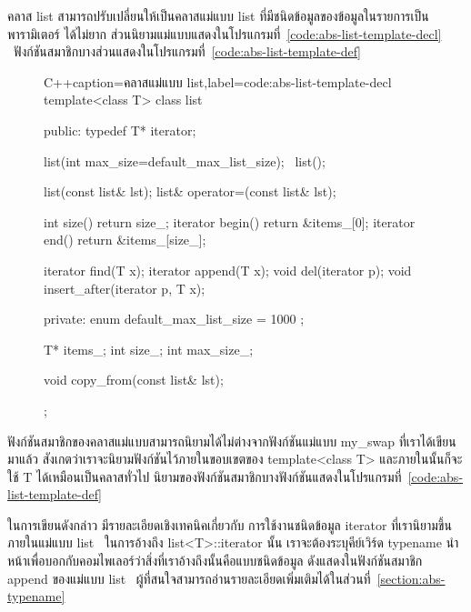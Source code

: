 ค{\wbr}ลา{\wbr}ส {\ct list} สามารถ{\wbr}ปรับ{\wbr}เปลี่ยน{\wbr}ให้{\wbr}เป็น{\wbr}ค{\wbr}ลา{\wbr}ส{\wbr}แม่แบบ {\ct list}
ที่{\wbr}มี{\wbr}ชนิด{\wbr}ข้อมูล{\wbr}ของ{\wbr}ข้อมูล{\wbr}ใน{\wbr}รายการ{\wbr}เป็น{\wbr}พารามิเตอร์ ได้{\wbr}ไม่{\wbr}ยาก{\wbr}
ส่วน{\wbr}นิยาม{\wbr}แม่แบบ{\wbr}แสดง{\wbr}ใน{\wbr}โปรแกรม{\wbr}ที่~\ref{code:abs-list-template-decl}
\ ฟังก์ชัน{\wbr}สมาชิก{\wbr}บาง{\wbr}ส่วน{\wbr}แสดง{\wbr}ใน{\wbr}โปรแกรม{\wbr}ที่~\ref{code:abs-list-template-def}

\begin{figure}
\latintext
\begin{codelist}{C++}{caption={\thaitext ค{\wbr}ลา{\wbr}ส{\wbr}แม่แบบ {\ct list}\latintext},label=code:abs-list-template-decl}
template<class T>
class list {
public:
  typedef T* iterator;

  list(int max_size=default_max_list_size);
  ~list();

  list(const list& lst);
  list& operator=(const list& lst);

  int size() { return size_; }
  iterator begin() { return &items_[0]; }
  iterator end() { return &items_[size_]; }

  iterator find(T x);
  iterator append(T x);
  void del(iterator p);
  void insert_after(iterator p, T x);

private:
  enum { default_max_list_size = 1000 };

  T* items_;
  int size_;
  int max_size_;

  void copy_from(const list& lst);
};
\end{codelist}
\thaitext
\end{figure}

ฟังก์ชัน{\wbr}สมาชิก{\wbr}ของ{\wbr}ค{\wbr}ลา{\wbr}ส{\wbr}แม่แบบ{\wbr}สามารถ{\wbr}นิยาม{\wbr}ได้{\wbr}ไม่{\wbr}ต่าง{\wbr}จาก{\wbr}ฟังก์ชัน{\wbr}แม่แบบ {\ct my\_swap}
ที่{\wbr}เรา{\wbr}ได้{\wbr}เขียน{\wbr}มา{\wbr}แล้ว สังเกต{\wbr}ว่า{\wbr}เรา{\wbr}จะ{\wbr}นิยาม{\wbr}ฟังก์ชัน{\wbr}ไว้{\wbr}ภายใน{\wbr}ขอบเขต{\wbr}ของ {\ct
  template<class T>} และ{\wbr}ภายใน{\wbr}นั้น{\wbr}ก็{\wbr}จะ{\wbr}ใช้ {\ct T} ได้{\wbr}เหมือน{\wbr}เป็น{\wbr}ค{\wbr}ลา{\wbr}ส{\wbr}ทั่วไป{\wbr}
นิยาม{\wbr}ของ{\wbr}ฟังก์ชัน{\wbr}สมาชิก{\wbr}บาง{\wbr}ฟังก์ชัน{\wbr}แสดง{\wbr}ใน{\wbr}โปรแกรม{\wbr}ที่~\ref{code:abs-list-template-def}

ใน{\wbr}การ{\wbr}เขียน{\wbr}ดังกล่าว มี{\wbr}รายละเอียด{\wbr}เชิง{\wbr}เทคนิค{\wbr}เกี่ยวกับ การ{\wbr}ใช้{\wbr}งาน{\wbr}ชนิด{\wbr}ข้อมูล {\ct
  iterator} ที่{\wbr}เรา{\wbr}นิยาม{\wbr}ขึ้น{\wbr}ภายใน{\wbr}แม่แบบ {\ct list} \ ใน{\wbr}การ{\wbr}อ้าง{\wbr}ถึง {\ct
  list<T>::iterator} นั้น เรา{\wbr}จะ{\wbr}ต้อง{\wbr}ระบุ{\wbr}คีย์{\wbr}เวิร์ด {\ct typename}
นำหน้า{\wbr}เพื่อ{\wbr}บอก{\wbr}กับ{\wbr}คอม{\wbr}ไพ{\wbr}เลอร์{\wbr}ว่า{\wbr}สิ่ง{\wbr}ที่{\wbr}เรา{\wbr}อ้าง{\wbr}ถึง{\wbr}นั้น{\wbr}คือ{\wbr}แบบ{\wbr}ชนิด{\wbr}ข้อมูล ดัง{\wbr}แสดง{\wbr}ใน{\wbr}ฟังก์ชัน{\wbr}สมาชิก{\wbr}
{\ct append} ของ{\wbr}แม่แบบ {\ct list}
\ ผู้{\wbr}ที่{\wbr}สนใจ{\wbr}สามารถ{\wbr}อ่าน{\wbr}รายละเอียด{\wbr}เพิ่มเติม{\wbr}ได้{\wbr}ใน{\wbr}ส่วน{\wbr}ที่~\ref{section:abs-typename}


